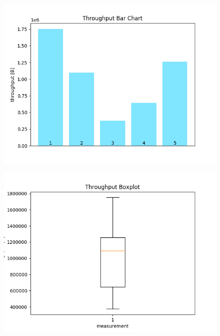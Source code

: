 \documentclass{article}
\begin{document}
	


\begin{figure}[ht] \label{usrp-success-11}
	\includegraphics[width=\textwidth]{throughput_bar_chart}	
\end{figure}


\begin{figure}[ht] \label{usrp-success-13}
	\includegraphics[width=\textwidth]{throughput_boxplot}	
\end{figure}


\end{document}
